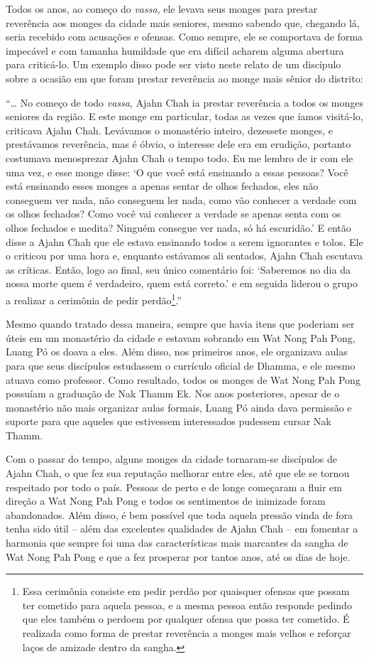 Todos os anos, ao começo do \emph{vassa}, ele levava seus monges para
prestar reverência aos monges da cidade mais seniores, mesmo sabendo
que, chegando lá, seria recebido com acusações e ofensas. Como sempre,
ele se comportava de forma impecável e com tamanha humildade que era
difícil acharem alguma abertura para criticá-lo. Um exemplo disso pode
ser visto neste relato de um discípulo sobre a ocasião em que foram
prestar reverência ao monge mais sênior do distrito:

``\ldots{} No começo de todo \emph{vassa}, Ajahn Chah ia prestar
reverência a todos os monges seniores da região. E este monge em
particular, todas as vezes que íamos visitá-lo, criticava Ajahn Chah.
Levávamos o monastério inteiro, dezessete monges, e prestávamos
reverência, mas é óbvio, o interesse dele era em erudição, portanto
costumava menosprezar Ajahn Chah o tempo todo. Eu me lembro de ir com
ele uma vez, e esse monge disse: `O que você está ensinando a essas
pessoas? Você está ensinando esses monges a apenas sentar de olhos
fechados, eles não conseguem ver nada, não conseguem ler nada, como vão
conhecer a verdade com os olhos fechados? Como você vai conhecer a
verdade se apenas senta com os olhos fechados e medita? Ninguém consegue
ver nada, só há escuridão.' E então disse a Ajahn Chah que ele estava
ensinando todos a serem ignorantes e tolos. Ele o criticou por uma hora
e, enquanto estávamos ali sentados, Ajahn Chah escutava as críticas.
Então, logo ao final, seu único comentário foi: `Saberemos no dia da
nossa morte quem é verdadeiro, quem está correto.' e em seguida liderou
o grupo a realizar a cerimônia de pedir perdão\footnote{Essa cerimônia
  consiste em pedir perdão por quaisquer ofensas que possam ter cometido
  para aquela pessoa, e a mesma pessoa então responde pedindo que eles
  também o perdoem por qualquer ofensa que possa ter cometido. É
  realizada como forma de prestar reverência a monges mais velhos e
  reforçar laços de amizade dentro da sangha.}.''

Mesmo quando tratado dessa maneira, sempre que havia itens que poderiam
ser úteis em um monastério da cidade e estavam sobrando em Wat Nong Pah
Pong, Luang Pó os doava a eles. Além disso, nos primeiros anos, ele
organizava aulas para que seus discípulos estudassem o currículo oficial
de Dhamma, e ele mesmo atuava como professor. Como resultado, todos os
monges de Wat Nong Pah Pong possuíam a graduação de Nak Thamm Ek. Nos
anos posteriores, apesar de o monastério não mais organizar aulas
formais, Luang Pó ainda dava permissão e suporte para que aqueles que
estivessem interessados pudessem cursar Nak Thamm.

Com o passar do tempo, alguns monges da cidade tornaram-se discípulos de
Ajahn Chah, o que fez sua reputação melhorar entre eles, até que ele se
tornou respeitado por todo o país. Pessoas de perto e de longe começaram
a fluir em direção a Wat Nong Pah Pong e todos os sentimentos de
inimizade foram abandonados. Além disso, é bem possível que toda aquela
pressão vinda de fora tenha sido útil -- além das excelentes qualidades
de Ajahn Chah -- em fomentar a harmonia que sempre foi uma das
características mais marcantes da sangha de Wat Nong Pah Pong e que a
fez prosperar por tantos anos, até os dias de hoje.
